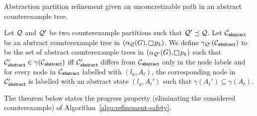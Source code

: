 \begin{algorithm}[b]

\caption{Abstraction partition refinement given an unconcretizable path in an  abstract counterexample tree.}
\label{algo:refinement-safety}

\end{algorithm}

Let $\mathcal{Q}$ and $\mathcal{Q}'$ be two counterexample partitions such that $\mathcal{Q}' \preceq \mathcal{Q}$. Let $\mathcal{C}_{\mathsf{abstract}}$ be an abstract counterexample  tree in $(\alpha_\part(G),\LTLglobally p_k)$. We define $\gamma_{\mathcal{Q}'}(\mathcal{C}_{\mathsf{abstract}})$ to be the set of abstract counterexample trees in $(\alpha_{\part'}(G),\LTLglobally p_k)$ such that $\mathcal{C}'_{\mathsf{abstract}} \in \gamma(\mathcal{C}_{\mathsf{abstract}})$ iff $\mathcal{C}'_{\mathsf{abstract}}$ differs from $\mathcal{C}_{\mathsf{abstract}}$ only in the node labels and for every node in $\mathcal{C}_{\mathsf{abstract}}$ labelled with $(l_a,A_t)$, the corresponding node in $\mathcal{C}'_{\mathsf{abstract}}$ is labelled with an abstract state $(l_a,A_t')$ such that $\gamma(A_t') \subseteq \gamma(A_t)$.
 
The theorem below states the progress property (eliminating the considered counterexample) of Algorithm~\ref{algo:refinement-safety}.

